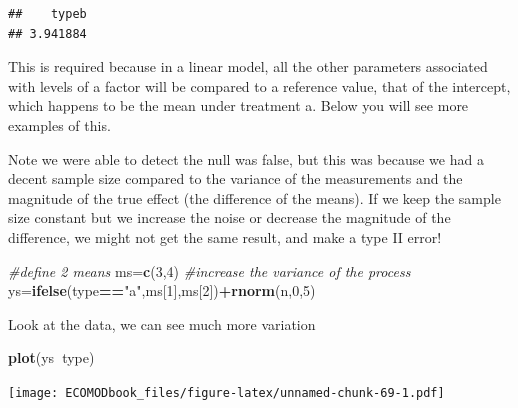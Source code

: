 \documentclass[
]{book}
\newenvironment{Shaded}{\begin{snugshade}}{\end{snugshade}}
\newcommand{\CommentTok}[1]{\textcolor[rgb]{0.56,0.35,0.01}{\textit{#1}}}
\newcommand{\DecValTok}[1]{\textcolor[rgb]{0.00,0.00,0.81}{#1}}
\newcommand{\KeywordTok}[1]{\textcolor[rgb]{0.13,0.29,0.53}{\textbf{#1}}}
\newcommand{\NormalTok}[1]{#1}
\newcommand{\OperatorTok}[1]{\textcolor[rgb]{0.81,0.36,0.00}{\textbf{#1}}}
\newcommand{\StringTok}[1]{\textcolor[rgb]{0.31,0.60,0.02}{#1}}
\begin{document}
\begin{Shaded}
\end{Shaded}

\begin{verbatim}
##    typeb 
## 3.941884
\end{verbatim}

This is required because in a linear model, all the other parameters associated with levels of a factor will be compared to a reference value, that of the intercept, which happens to be the mean under treatment a. Below you will see more examples of this.

Note we were able to detect the null was false, but this was because we had a decent sample size compared to the variance of the measurements and the magnitude of the true effect (the difference of the means). If we keep the sample size constant but we increase the noise or decrease the magnitude of the difference, we might not get the same result, and make a type II error!

\begin{Shaded}
\begin{Highlighting}[]
\CommentTok{#define 2 means}
\NormalTok{ms=}\KeywordTok{c}\NormalTok{(}\DecValTok{3}\NormalTok{,}\DecValTok{4}\NormalTok{)}
\CommentTok{#increase the variance of the process}
\NormalTok{ys=}\KeywordTok{ifelse}\NormalTok{(type}\OperatorTok{==}\StringTok{"a"}\NormalTok{,ms[}\DecValTok{1}\NormalTok{],ms[}\DecValTok{2}\NormalTok{])}\OperatorTok{+}\KeywordTok{rnorm}\NormalTok{(n,}\DecValTok{0}\NormalTok{,}\DecValTok{5}\NormalTok{)}
\end{Highlighting}
\end{Shaded}

Look at the data, we can see much more variation

\begin{Shaded}
\begin{Highlighting}[]
\KeywordTok{plot}\NormalTok{(ys}\OperatorTok{~}\NormalTok{type)}
\end{Highlighting}
\end{Shaded}

\texttt{[image: ECOMODbook\_files/figure-latex/unnamed-chunk-69-1.pdf]}
\end{document}

